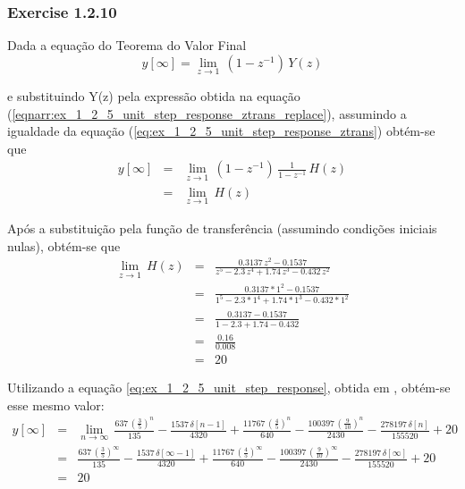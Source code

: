 \documentclass[a4paper]{article}
\begin{document}
\subsubsection{Exercise 1.2.10}
\noindent Dada a equação do Teorema do Valor Final
\begin{equation}
	y[\infty] = \lim_{z \to 1} \, (1 - z^{-1}) \, Y(z)
\end{equation}

\noindent e substituindo Y(z) pela expressão obtida na equação (\ref{eqnarr:ex_1_2_5_unit_step_response_ztrans_replace}), assumindo a igualdade da equação (\ref{eq:ex_1_2_5_unit_step_response_ztrans}) obtém-se que
\begin{eqnarray}
	y[\infty] & = & \lim_{z \to 1} \, (1 - z^{-1}) \, \frac{1}{1 - z^{-1}} \, H(z) \\
	& = & \lim_{z \to 1} \, H(z)
\end{eqnarray}

\noindent Após a substituição pela função de transferência (assumindo condições iniciais nulas), obtém-se que
\begin{eqnarray}
	\lim_{z \to 1} \, H(z) & = & \frac{0.3137 \, z^{2} - 0.1537}{z^{5} - 2.3 \, z^{4} + 1.74 \, z^{3} - 0.432 \, z^{2}} \\
	& = & \frac{0.3137 * 1^{2} - 0.1537}{1^{5} - 2.3 * 1^{4} + 1.74 * 1^{3} - 0.432 * 1^{2}} \\
	& = & \frac{0.3137 - 0.1537}{1 - 2.3 + 1.74 - 0.432} \\
	& = & \frac{0.16}{0.008} \\
	& = & 20
\end{eqnarray}

\noindent Utilizando a equação \ref{eq:ex_1_2_5_unit_step_response}, obtida em \emph{}, obtém-se esse mesmo valor:
\begin{eqnarray}
	y[\infty] & = & \lim_{n \to \infty} \, \frac{637 \, \left(\frac{3}{5}\right)^n}{135} - \frac{1537 \, \delta[n - 1]}{4320} + \frac{11767 \, \left(\frac{4}{5}\right)^n}{640} - \frac{100397 \, \left(\frac{9}{10}\right)^n}{2430} - \frac{278197 \, \delta[n]}{155520} + 20 \\
	& = & \frac{637 \, \left(\frac{3}{5}\right)^\infty}{135} - \frac{1537 \, \delta[\infty - 1]}{4320} + \frac{11767 \, \left(\frac{4}{5}\right)^\infty}{640} - \frac{100397 \, \left(\frac{9}{10}\right)^\infty}{2430} - \frac{278197 \, \delta[\infty]}{155520} + 20 \\
	& = & 20
\end{eqnarray}
\end{document}
